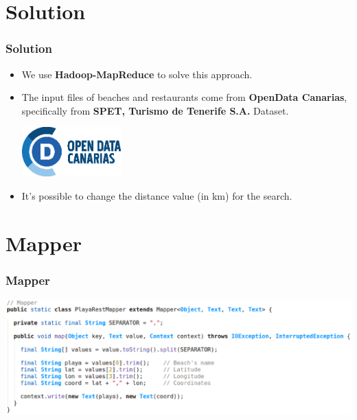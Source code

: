 \documentclass{beamer}
\begin{document}
\section{Solution}
\begin{frame}
  \frametitle{Solution}
  
  \begin{itemize}
    \item We use {\bfseries Hadoop-MapReduce} to solve this approach.
    \item The input files of beaches and restaurants come from {\bfseries OpenData Canarias}, 
    specifically from {\bfseries SPET, Turismo de Tenerife S.A.} Dataset.
    \newline
    \begin{center}
      \includegraphics[width=0.3\textwidth]{img/logo_open-02.eps}
      \newline
    \end{center}
    \item It's possible to change the distance value (in km) for the search.
  \end{itemize}

\end{frame}

\section{Mapper}
\begin{frame}
  \frametitle{Mapper}  
  
  \includegraphics[width=\textwidth]{img/1.eps}
  
\end{frame}
\end{document}
